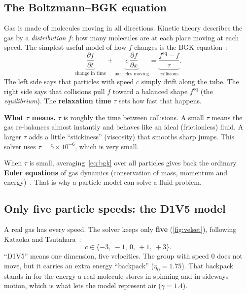 \documentclass[11pt]{article}
\newcommand{\feq}{f^{\mathrm{eq}}}
\begin{document}
\subsection{The Boltzmann--BGK equation}
Gas is made of molecules moving in all directions.  Kinetic theory describes the gas
by a \emph{distribution} $f$: how many molecules are at each place moving at each
speed.  The simplest useful model of how $f$ changes is the BGK
equation~\citep{BGK1954}:
\begin{equation}
  \underbrace{\frac{\partial f}{\partial t}}_{\text{change in time}}
  + \underbrace{c\,\frac{\partial f}{\partial x}}_{\text{particles moving}}
  = \underbrace{\frac{\feq - f}{\tau}}_{\text{collisions}} .
  \label{eq:bgk}
\end{equation}
The left side says that particles with speed $c$ simply drift along the tube.  The
right side says that collisions pull $f$ toward a balanced shape $\feq$ (the
\emph{equilibrium}).  The \textbf{relaxation time} $\tau$ sets how fast that happens.

\begin{idea}
\textbf{What $\tau$ means.}  $\tau$ is roughly the time between collisions.  A small
$\tau$ means the gas re-balances almost instantly and behaves like an ideal
(frictionless) fluid.  A larger $\tau$ adds a little ``stickiness'' (viscosity) that
smooths sharp jumps.  This solver uses $\tau = 5\times10^{-6}$, which is very small.
\end{idea}

When $\tau$ is small, averaging~\eqref{eq:bgk} over all particles gives back the
ordinary \textbf{Euler equations} of gas dynamics (conservation of mass, momentum
and energy)~\citep{ChapmanCowling1970}.  That is why a particle model can solve a
fluid problem.

\subsection{Only five particle speeds: the D1V5 model}
A real gas has every speed.  The solver keeps only \textbf{five}
(\cref{fig:velset}), following Kataoka and Tsutahara~\citep{KataokaTsutahara2004Euler}:
\[
c \in \{-3,\ -1,\ 0,\ +1,\ +3\}.
\]
``D1V5'' means one dimension, five velocities.  The group with speed $0$ does not
move, but it carries an extra energy ``backpack'' ($\eta_0 = 1.75$).  That backpack
stands in for the energy a real molecule stores in spinning and in sideways motion,
which is what lets the model represent air ($\gamma = 1.4$).
\end{document}
